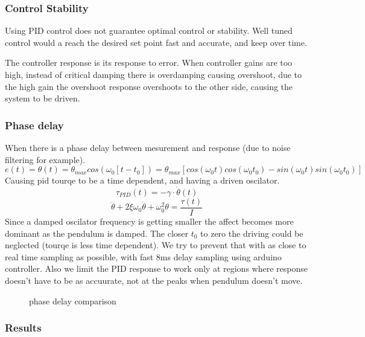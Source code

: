 \documentclass[\main/master.tex]{subfiles}
\begin{document}
\subsubsection{Control Stability}
Using PID control does not guarantee optimal control or stability. Well tuned control would a reach the desired set point fast and accurate, and keep over time.
\par
The controller response is its response to error. When controller gains are too high, instead of critical damping there is overdamping causing overshoot, due to the high gain the overshoot response overshoots to the other side, causing the system to be driven.



\subsubsection{Phase delay}
When there is a phase delay between mesurement and response (due to noise filtering for example).
\begin{equation}
e(t) = \theta(t) = \theta_{max}cos(\omega_0 [t-t_0] ) = \theta_{max}[ cos(\omega_0 t)cos(\omega_0 t_0) - sin(\omega_0 t)sin(\omega_0 t_0)]    \label{eqn:error}
\end{equation}
Causing pid tourqe to be a time dependent, and having a driven oscilator. 
\begin{equation}
\tau_{PID}(t) = -\gamma\cdot\dot{\theta}(t)   \label{eqn:friction_tourqe}
\end{equation}
\begin{equation}
\ddot{\theta} + 2\xi\omega_0\dot{\theta} + \omega_0^2\theta = \frac{\tau(t)}{I}   \label{eqn:damped_motion_equation}
\end{equation}
Since a damped oscilator frequency is getting smaller the affect becomes more dominant as the pendulum is damped. The closer $t_0$ to zero the driving could be neglected (tourqe is less time dependent). We try to prevent that with as close to real time sampling as possible, with fast 8ms delay sampling using arduino controller. Also we limit the PID response to work only at regions where response doesn't have to be as accuurate, not at the peaks when pendulum doesn't move. 

\begin{figure}[htbp]
	\centering
	\caption[phase delay]{phase delay comparison}
	\label{fig:phase delay}
\end{figure}
\newpage
\subsubsection{Results}
\end{document}
